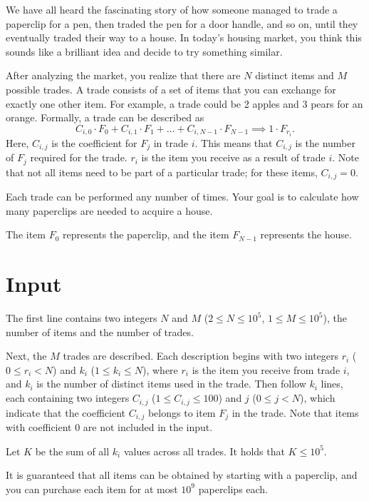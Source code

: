 
We have all heard the fascinating story of how someone managed to trade a paperclip for a pen, then traded the pen for a door handle, and so on, until they eventually traded their way to a house. 
In today's housing market, you think this sounds like a brilliant idea and decide to try something similar.

After analyzing the market, you realize that there are $N$ distinct items and $M$ possible trades. 
A trade consists of a set of items that you can exchange for exactly one other item. 
For example, a trade could be 2 apples and 3 pears for an orange. Formally, a trade can be described as 
$$
C_{i,0} \cdot F_0 + C_{i,1} \cdot F_1 + \dots + C_{i,N-1} \cdot F_{N-1} \implies 1 \cdot F_{r_i}.
$$
Here, $C_{i,j}$ is the coefficient for $F_j$ in trade $i$. This means that $C_{i,j}$ is the number of $F_j$ required for the trade. $r_i$ is the item you receive as a result of trade $i$. 
Note that not all items need to be part of a particular trade; for these items, $C_{i,j} = 0$.

Each trade can be performed any number of times. Your goal is to calculate how many paperclips are needed to acquire a house.

The item $F_0$ represents the paperclip, and the item $F_{N-1}$ represents the house.

\section*{Input}
The first line contains two integers $N$ and $M$ ($2 \leq N \leq 10^5$, $1 \leq M \leq 10^5$), the number of items and the number of trades.

Next, the $M$ trades are described. Each description begins with two integers $r_i$ ($0 \leq r_i < N$) and $k_i$ ($1 \leq k_i \leq N$), 
where $r_i$ is the item you receive from trade $i$, and $k_i$ is the number of distinct items used in the trade. 
Then follow $k_i$ lines, each containing two integers $C_{i,j}$ ($1 \leq C_{i,j} \leq 100$) and $j$ ($0 \leq j < N$), which indicate that the coefficient $C_{i,j}$ belongs to item $F_j$ in the trade. Note that 
items with coefficient $0$ are not included in the input.

Let $K$ be the sum of all $k_i$ values across all trades. It holds that $K \leq 10^5$.

It is guaranteed that all items can be obtained by starting with a paperclip, and you can purchase each item for at most $10^9$ paperclips each.

